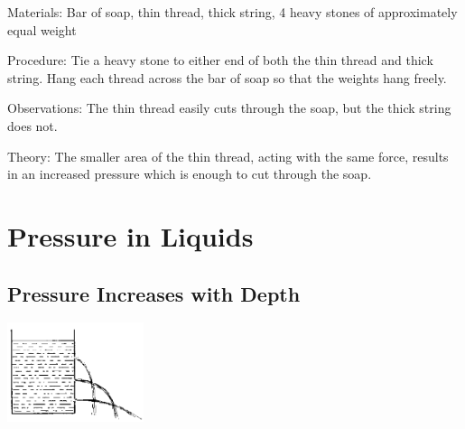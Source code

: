 \begin{multicols}{2}
\begin{description*}
\item[Materials:]{Bar of soap, thin thread, thick string, 4 heavy stones of approximately equal weight}
\item[Procedure:]{Tie a heavy stone to either end of both the thin thread and thick string. Hang each thread across the bar of soap so that the weights hang freely.}
\item[Observations:]{The thin thread easily cuts through the soap, but the thick string does not.}
\item[Theory:]{The smaller area of the thin thread, acting with the same force, results in an increased pressure which is enough to cut through the soap.}
\end{description*}


\section*{Pressure in Liquids}


\subsection{Pressure Increases with Depth}

\begin{center}
\includegraphics[width=0.3\textwidth]{./img/source/pressure-depth.png}
\end{center}


\end{multicols}
